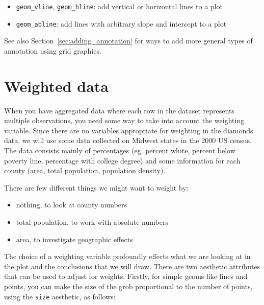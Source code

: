 \begin{itemize}
	\item {\tt geom\_vline}, {\tt geom\_hline}: add vertical or horizontal lines to a plot
	\item {\tt geom\_abline}: add lines with arbitrary slope and intercept to a plot
\end{itemize}

See also Section~\ref{sec:adding_annotation} for ways to add more general types of annotation using grid graphics.

\section{Weighted data}\label{sec:weighted_data}


When you have aggregated data where each row in the dataset represents multiple observations, you need some way to take into account the weighting variable.  Since there are no variables appropriate for weighting in the diamonds data, we will use some data collected on Midwest states in the 2000 US census.  The data consists mainly of percentages (eg. percent white, percent below poverty line, percentage with college degree) and some information for each county (area, total population, population density).

There are few different things we might want to weight by: 

\begin{itemize}
	\item nothing, to look at county numbers
	\item total population, to work with absolute numbers
	\item area, to investigate geographic effects
\end{itemize}

\noindent The choice of a weighting variable profoundly effects what we are looking at in the plot and the conclusions that we will draw.  There are two aesthetic attributes that can be used to adjust for weights.  Firstly, for simple geoms like lines and points, you can make the size of the grob proportional to the number of points, using the {\tt size} aesthetic, as follows:

